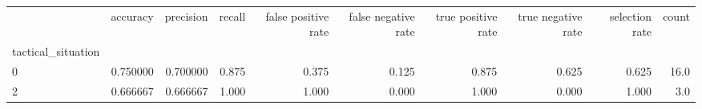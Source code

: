 \begin{tabular}{lrrrrrrrrr}
\toprule
{} &  accuracy &  precision &  recall &  false positive rate &  false negative rate &  true positive rate &  true negative rate &  selection rate &  count \\
tactical\_situation &           &            &         &                      &                      &                     &                     &                 &        \\
\midrule
0                  &  0.750000 &   0.700000 &   0.875 &                0.375 &                0.125 &               0.875 &               0.625 &           0.625 &   16.0 \\
2                  &  0.666667 &   0.666667 &   1.000 &                1.000 &                0.000 &               1.000 &               0.000 &           1.000 &    3.0 \\
\bottomrule
\end{tabular}

